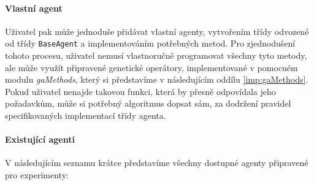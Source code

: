 \paragraph{Vlastní agent}
Uživatel pak může jednoduše přidávat vlastní agenty, vytvořením třídy odvozené
od třídy \texttt{BaseAgent} a implementováním potřebných metod. Pro
zjednodušení tohoto procesu, uživatel nemusí vlastnoručně programovat všechny
tyto metody, ale může využít připravené genetické operátory, implementované v
pomocném modulu \emph{gaMethods}, který si představíme v následujícím oddílu
\ref{imp:gaMethods}. Pokud uživatel nenajde takovou funkci, která by přesně
odpovídala jeho požadavkům, může si potřebný algoritmus dopsat sám, za dodržení
pravidel specifikovaných implementací třídy agenta.

\paragraph{Existující agenti}
V následujícím seznamu krátce představíme všechny dostupné agenty připravené
pro experimenty:

